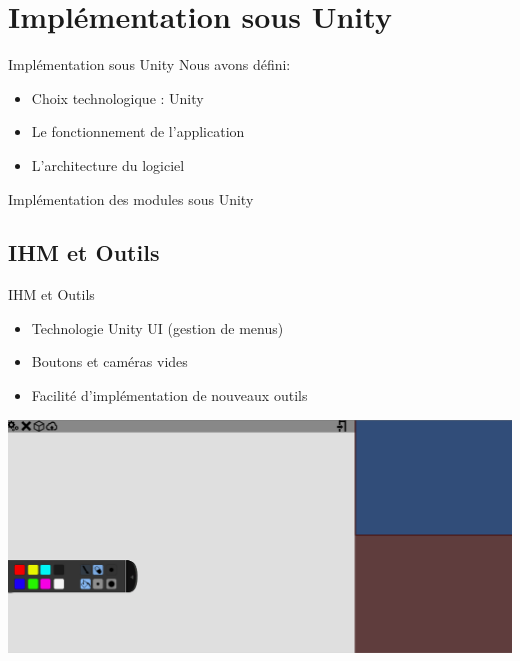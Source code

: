 \documentclass[a4paper,10pt]{beamer}
\begin{document}
	\section{Implémentation sous Unity}
			\begin{frame}{Implémentation sous Unity}
				Nous avons défini:
					\begin{itemize}
						\item Choix technologique : Unity
						\item Le fonctionnement de l'application
						\item L'architecture du logiciel
					\end{itemize}
				Implémentation des modules sous Unity
			\end{frame}
		
	\subsection{IHM et Outils}
	\begin{frame}{IHM et Outils}

				\begin{itemize}
					\item Technologie Unity UI (gestion de menus)
					\item Boutons et caméras vides
					\item Facilité d'implémentation de nouveaux outils
				\end{itemize}
				\centerline{\includegraphics[scale=0.2]{images/Nono/img8.png}}
			
	\end{frame}
	
\end{document}

